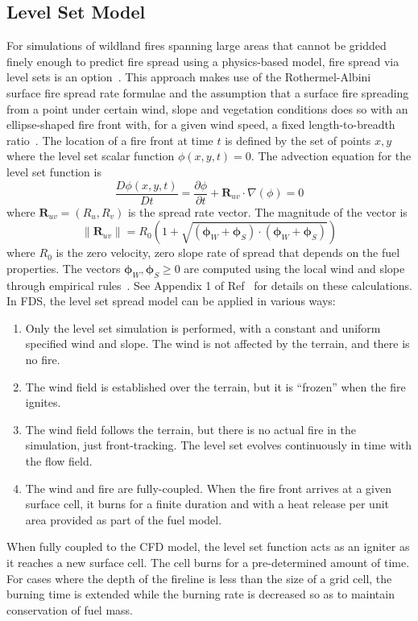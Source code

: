 \documentclass[journal,article,atmosphere,submit,moreauthors,pdftex]{Definitions/mdpi}
\begin{document}
\subsection{Level Set Model}

For simulations of wildland fires spanning large areas that cannot be gridded finely enough to predict fire spread using a physics-based model, fire spread via level sets is an option~\cite{Bova:IJWF2015}. This approach makes use of the Rothermel-Albini~\cite{Rothermel:1972,Albini:1976} surface fire spread rate formulae and the assumption that a surface fire spreading from a point under certain wind, slope and vegetation conditions does so with an ellipse-shaped fire front with, for a given wind speed, a fixed length-to-breadth ratio~\cite{Richards:1990}. The location of a fire front at time $t$ is defined by the set of points $x,y$ where the level set scalar function $\phi(x,y,t)=0$. The advection equation for the level set function is
\begin{equation}
   \frac{D \phi(x,y,t)}{D t} =  \frac{\partial \phi}{\partial t} + \mathbf{R}_{uv} \cdot \nabla (\phi) = 0 \label{eqn:lset}
\end{equation}
where $\mathbf{R}_{uv}=(R_u,R_v)$ is the spread rate vector. The magnitude of the vector is
\begin{equation}
  \|\mathbf{R}_{uv}\|=R_0 \left(1 + \sqrt{(\boldsymbol{\phi}_W+\boldsymbol{\phi}_S) \cdot (\boldsymbol{\phi}_W+\boldsymbol{\phi}_S) } \right)
\end{equation}
where $R_0$ is the zero velocity, zero slope rate of spread that depends on the fuel properties. The vectors $\boldsymbol{\phi}_W,\boldsymbol{\phi}_S \ge 0$ are computed using the local wind and slope through empirical rules~\cite{Wilson:1980}. See Appendix 1 of Ref~\cite{Bova:IJWF2015} for details on these calculations. In FDS, the level set spread model can be applied in various ways:
\begin{enumerate}
\item Only the level set simulation is performed, with a constant and uniform specified wind and slope. The wind is not affected by the terrain, and there is no fire.
\item The wind field is established over the terrain, but it is ``frozen'' when the fire ignites.
\item The wind field follows the terrain, but there is no actual fire in the simulation, just front-tracking.  The level set evolves continuously in time with the flow field.
\item The wind and fire are fully-coupled. When the fire front arrives at a given surface cell, it burns for a finite duration and with a heat release per unit area provided as part of the fuel model.
\end{enumerate}
When fully coupled to the CFD model, the level set function acts as an igniter as it reaches a new surface cell. The cell burns for a pre-determined amount of time. For cases where the depth of the fireline is less than the size of a grid cell, the burning time is extended while the burning rate is decreased so as to maintain conservation of fuel mass.
\end{document}
